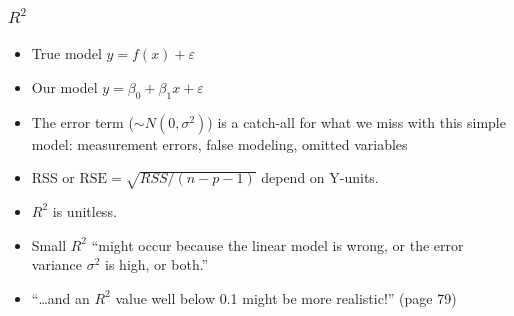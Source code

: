 \documentclass[serif, xcolor={dvipsnames}]{beamer} %
\begin{document}
\begin{frame}[t]
\frametitle{$R^2$}
\begin{itemize}[<+->]
\item True model $ y = f(x) + \varepsilon$\\
\item Our model $ y = \beta_0 + \beta_1x + \varepsilon$\\
\item The error term ($\sim N(0, \sigma^2)$) is a catch-all for what we miss with this
simple model: measurement errors, false modeling, omitted variables

\item RSS or $\text{RSE} = \sqrt{RSS/(n-p-1)}$ depend on Y-units. 

\item $R^2$ is unitless.

\item Small $R^2$ ``might occur because the linear model is wrong, or the error variance $\sigma^2$ is high, or both.''

\item ``\dots  and an $R^2$ value well below 0.1 might be more realistic!'' (page 79)
\end{itemize}
\end{frame}
\end{document}
